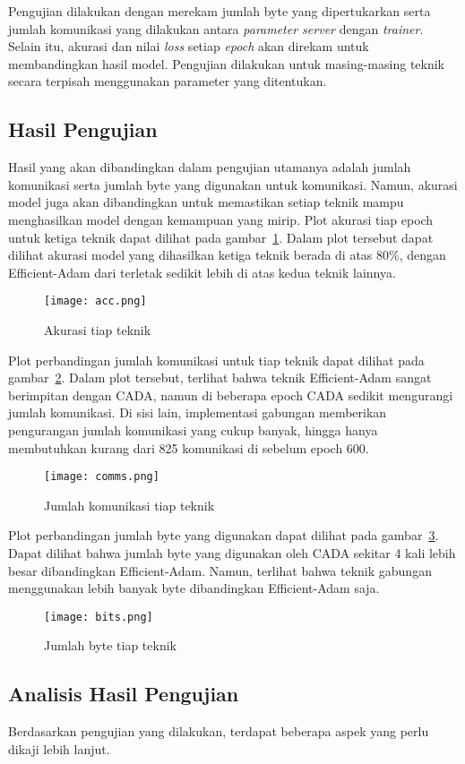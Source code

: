 Pengujian dilakukan dengan merekam jumlah byte yang dipertukarkan serta jumlah komunikasi yang dilakukan antara \emph{parameter server} dengan \emph{trainer}. Selain itu, akurasi dan nilai \emph{loss} setiap \emph{epoch} akan direkam untuk membandingkan hasil model. Pengujian dilakukan untuk masing-masing teknik secara terpisah menggunakan parameter yang ditentukan.

\subsection{Hasil Pengujian}

Hasil yang akan dibandingkan dalam pengujian utamanya adalah jumlah komunikasi serta jumlah byte yang digunakan untuk komunikasi. Namun, akurasi model juga akan dibandingkan untuk memastikan setiap teknik mampu menghasilkan model dengan kemampuan yang mirip. Plot akurasi tiap epoch untuk ketiga teknik dapat dilihat pada gambar~\ref{acc}. Dalam plot tersebut dapat dilihat akurasi model yang dihasilkan ketiga teknik berada di atas 80\%, dengan Efficient-Adam dari \textcite{Chen2022Efficient} terletak sedikit lebih di atas kedua teknik lainnya.
\begin{figure}[ht]
  \centering
  \texttt{[image: acc.png]}
  \caption{Akurasi tiap teknik}\label{acc}
\end{figure}

Plot perbandingan jumlah komunikasi untuk tiap teknik dapat dilihat pada gambar~\ref{comms}. Dalam plot tersebut, terlihat bahwa teknik Efficient-Adam sangat berimpitan dengan CADA, namun di beberapa epoch CADA sedikit mengurangi jumlah komunikasi. Di sisi lain, implementasi gabungan memberikan pengurangan jumlah komunikasi yang cukup banyak, hingga hanya membutuhkan kurang dari 825 komunikasi di sebelum epoch 600.

\begin{figure}[ht]
  \centering
  \texttt{[image: comms.png]}
  \caption{Jumlah komunikasi tiap teknik}\label{comms}
\end{figure}

Plot perbandingan jumlah byte yang digunakan dapat dilihat pada gambar~\ref{bits}. Dapat dilihat bahwa jumlah byte yang digunakan oleh CADA sekitar 4 kali lebih besar dibandingkan Efficient-Adam. Namun, terlihat bahwa teknik gabungan menggunakan lebih banyak byte dibandingkan Efficient-Adam saja.
\begin{figure}[ht]
  \centering
  \texttt{[image: bits.png]}
  \caption{Jumlah byte tiap teknik}\label{bits}
\end{figure}


\subsection{Analisis Hasil Pengujian}
Berdasarkan pengujian yang dilakukan, terdapat beberapa aspek yang perlu dikaji lebih lanjut.
